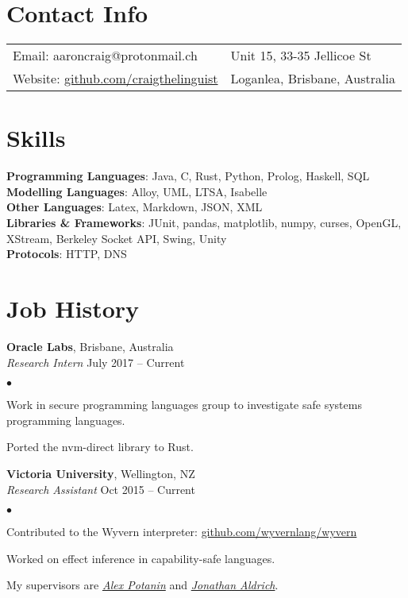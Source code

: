\documentclass[margin,line]{res}
\newenvironment{list2}{
  \begin{list}{$\bullet$}{%
      \setlength{\itemsep}{0in}
      \setlength{\parsep}{0in} \setlength{\parskip}{0in}
      \setlength{\topsep}{0in} \setlength{\partopsep}{0in}
      \setlength{\leftmargin}{0.2in}}}
  {\end{list}}
\begin{document}
\begin{resume}

  \section{\sc Contact Info}
    \vspace{.05in}
    \begin{tabular}{@{}p{3.5in}p{3in}}
      {Email}: aaroncraig@protonmail.ch & Unit 15, 33-35 Jellicoe St\\
      {Website}:  \url{github.com/craigthelinguist}& Loganlea, Brisbane, Australia \\
    \end{tabular}

   \section{\sc Skills}
    {\bf Programming Languages}: Java, C, Rust, Python, Prolog, Haskell, SQL\\
    {\bf Modelling Languages}: Alloy, UML, LTSA, Isabelle\\
    {\bf Other Languages}: Latex, Markdown, JSON, XML\\
    {\bf Libraries \& Frameworks}: JUnit, pandas, matplotlib, numpy, curses, OpenGL, XStream, Berkeley Socket API, Swing, Unity\\
    {\bf Protocols}: HTTP, DNS

  \section{\sc Job History}

    	{\bf Oracle Labs}, Brisbane, Australia\\
  	{\em Research Intern} \hfill {July 2017 -- Current}
  	\begin{list2}
  		\item Work in secure programming languages group to investigate safe systems programming languages.
		\item Ported the nvm-direct library to Rust.
	\end{list2}

  	{\bf Victoria University}, Wellington, NZ\\
  	{\em Research Assistant} \hfill {Oct 2015 -- Current}
  	\begin{list2}
  		\item Contributed to the Wyvern interpreter: \url{github.com/wyvernlang/wyvern}
		\item Worked on effect inference in capability-safe languages.
  		\item My supervisors are \href{http://homepages.mcs.vuw.ac.nz/~alex/}{\textit{Alex Potanin}} and \href{http://www.cs.cmu.edu/~./aldrich/index.html}{\textit{Jonathan Aldrich}}.
	\end{list2}
  

\end{resume}
\end{document}
